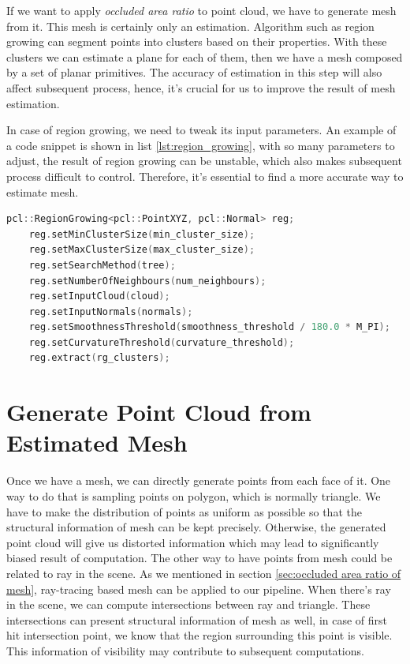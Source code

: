 \documentclass[11pt, a4paper,oneside,chapterprefix=false]{scrbook}
\begin{document}
If we want to apply \textit{occluded area ratio} to point cloud, we have to generate mesh from it. This mesh is certainly only an estimation. Algorithm such as region growing can segment points into clusters based on their properties. With these clusters we can estimate a plane for each of them, then we have a mesh composed by a set of planar primitives. The accuracy of estimation in this step will also affect subsequent process, hence, it's crucial for us to improve the result of mesh estimation. 

\vspace{10pt}

In case of region growing, we need to tweak its input parameters. An example of a code snippet is shown in list \ref{lst:region_growing}, with so many parameters to adjust, the result of region growing can be unstable, which also makes subsequent process difficult to control. Therefore, it's essential to find a more accurate way to estimate mesh.   
\begin{lstlisting}[language=C++, caption=region growing, label=lst:region_growing]
    pcl::RegionGrowing<pcl::PointXYZ, pcl::Normal> reg;
    reg.setMinClusterSize(min_cluster_size);
    reg.setMaxClusterSize(max_cluster_size);
    reg.setSearchMethod(tree);
    reg.setNumberOfNeighbours(num_neighbours);
    reg.setInputCloud(cloud);
    reg.setInputNormals(normals);
    reg.setSmoothnessThreshold(smoothness_threshold / 180.0 * M_PI);
    reg.setCurvatureThreshold(curvature_threshold);
    reg.extract(rg_clusters);
\end{lstlisting}

\section{Generate Point Cloud from Estimated Mesh} \label{generate point cloud from estimated mesh}

Once we have a mesh, we can directly generate points from each face of it. One way to do that is sampling points on polygon, which is normally triangle. We have to make the distribution of points as uniform as possible so that the structural information of mesh can be kept precisely. Otherwise, the generated point cloud will give us distorted information which may lead to significantly biased result of computation. The other way to have points from mesh could be related to ray in the scene. As we mentioned in section \ref{sec:occluded area ratio of mesh}, ray-tracing based mesh can be applied to our pipeline. When there's ray in the scene, we can compute intersections between ray and triangle. These intersections can present structural information of mesh as well, in case of first hit intersection point, we know that the region surrounding this point is visible. This information of visibility may contribute to subsequent computations. 
\end{document}
